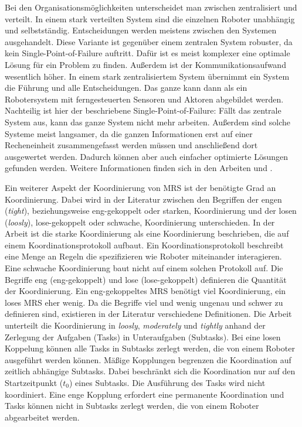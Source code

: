 Bei den Organisationsmöglichkeiten unterscheidet man zwischen zentralisiert und verteilt. In einem stark verteilten System sind die einzelnen Roboter unabhängig und selbstständig. Entscheidungen werden meistens zwischen den Systemen ausgehandelt. Diese Variante ist gegenüber einem zentralen System robuster, da kein Single-Point-of-Failure auftritt. Dafür ist es meist komplexer eine optimale Lösung für ein Problem zu finden. Außerdem ist der Kommunikationsaufwand wesentlich höher. In einem stark zentralisiertem System übernimmt ein System die Führung und alle Entscheidungen. Das ganze kann dann als ein Robotersystem mit ferngesteuerten Sensoren und Aktoren abgebildet werden. Nachteilig ist hier der beschriebene Single-Point-of-Failure: Fällt das zentrale System aus, kann das ganze System nicht mehr arbeiten. Außerdem sind solche Systeme meist langsamer, da die ganzen Informationen erst auf einer Recheneinheit zusammengefasst werden müssen und anschließend dort ausgewertet werden. Dadurch können aber auch einfacher optimierte Lösungen gefunden werden.\cite{lundh2006plan} Weitere Informationen finden sich in den Arbeiten \cite{farinelli2004multirobot} und \cite{dias2003comparative}. 

Ein weiterer Aspekt der Koordinierung von MRS ist der benötigte Grad an Koordinierung. Dabei wird in der Literatur zwischen den Begriffen der engen (\textit{tight}), beziehungsweise eng-gekoppelt oder starken, Koordinierung und der losen (\textit{loosly}), lose-gekoppelt oder schwache, Koordinierung unterschieden. In der Arbeit \cite{farinelli2004multirobot} ist die starke Koordinierung als eine Koordinierung beschrieben, die auf einem Koordinationsprotokoll aufbaut. Ein Koordinationsprotokoll beschreibt eine Menge an Regeln die spezifizieren wie Roboter miteinander interagieren. Eine schwache Koordinierung baut nicht auf einem solchen Protokoll auf. Die Begriffe eng (eng-gekoppelt) und lose (lose-gekoppelt) definieren die Quantität der Koordinierung. Ein eng-gekoppeltes MRS benötigt viel Koordinierung, ein loses MRS eher wenig. Da die Begriffe viel und wenig ungenau und schwer zu definieren sind, existieren in der Literatur verschiedene Definitionen. Die Arbeit \cite{kalra2004hoplites} unterteilt die Koordinierung in \textit{loosly}, \textit{moderately} und \textit{tightly} anhand der Zerlegung der Aufgaben (Tasks) in Unteraufgaben (Subtasks). Bei eine losen Koppelung können alle Tasks in Subtasks zerlegt werden, die von einem Roboter ausgeführt werden können. Mäßige Kopplungen begrenzen die Koordination auf zeitlich abhängige Subtasks. Dabei beschränkt sich die Koordination nur auf den Startzeitpunkt ($t_0$) eines Subtasks. Die Ausführung des Tasks wird nicht koordiniert. Eine enge Kopplung erfordert eine permanente Koordination und Tasks können nicht in Subtasks zerlegt werden, die von einem Roboter abgearbeitet werden.\cite{lundh2006plan} 

